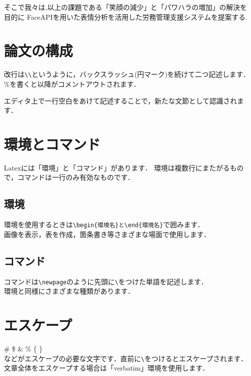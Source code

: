 そこで我々は,以上の課題である「笑顔の減少」と「パワハラの増加」の解決を目的に
FaceAPIを用いた表情分析を活用した労務管理支援システムを提案する.

\vspace{8mm}

\section{論文の構成}
\label{sec:tex_basic_newline}
    改行は\verb|\\|というように，バックスラッシュ(円マーク)を続けて二つ記述します．\\
    \%を書くと以降がコメントアウトされます．

    エディタ上で一行空白をあけて記述することで，新たな文節として認識されます．

\section{環境とコマンド}
\label{sec:tex_basic_envcmd}
    Latexには「環境」と「コマンド」があります．
    環境は複数行にまたがるもので，コマンドは一行のみ有効なものです．
\subsection{環境}
\label{sub:tex_basic_section_envcmd_env}
    環境を使用するときは\verb|\begin{環境名}と\end{環境名}|で囲みます．\\
    画像を表示，表を作成，箇条書き等さまざまな場面で使用します．
\subsection{コマンド}
\label{sub:tex_basic_section_envcmd_cmd}
    コマンドは\verb|\newpage|のように先頭に\verb|\|をつけた単語を記述します．\\
    環境と同様にさまざまな種類があります．

\section{エスケープ}
\label{sec:tex_basic_escape}
    \# \$ \& \% \{ \}  \\
    などがエスケープの必要な文字です．直前に\verb|\|をつけるとエスケープされます．\\
    文章全体をエスケープする場合は「verbatim」環境を使用します．
     
